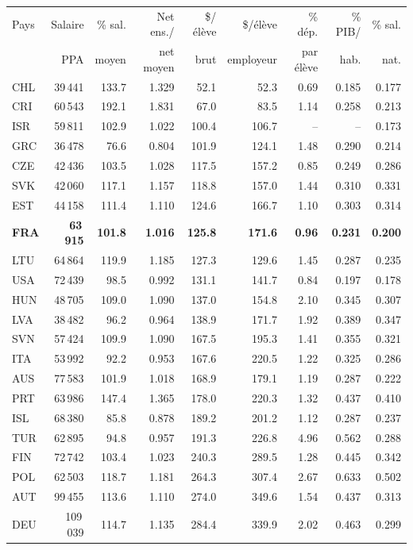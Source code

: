 \begin{tabular}{lrrrrrrrr}
\toprule
Pays & Salaire & \% sal. & Net ens./ & \$/élève & \$/élève & \% dép. & \% PIB/ & \% sal. \\
 & PPA & moyen & net moyen & brut & employeur & par élève & hab. & nat. \\
\midrule
CHL & 39\,441 & 133.7 & 1.329 & 52.1 & 52.3 & 0.69 & 0.185 & 0.177 \\
CRI & 60\,543 & 192.1 & 1.831 & 67.0 & 83.5 & 1.14 & 0.258 & 0.213 \\
ISR & 59\,811 & 102.9 & 1.022 & 100.4 & 106.7 & -- & -- & 0.173 \\
GRC & 36\,478 & 76.6 & 0.804 & 101.9 & 124.1 & 1.48 & 0.290 & 0.214 \\
CZE & 42\,436 & 103.5 & 1.028 & 117.5 & 157.2 & 0.85 & 0.249 & 0.286 \\
SVK & 42\,060 & 117.1 & 1.157 & 118.8 & 157.0 & 1.44 & 0.310 & 0.331 \\
EST & 44\,158 & 111.4 & 1.110 & 124.6 & 166.7 & 1.10 & 0.303 & 0.314 \\
\textbf{FRA} & \textbf{63\,915} & \textbf{101.8} & \textbf{1.016} & \textbf{125.8} & \textbf{171.6} & \textbf{0.96} & \textbf{0.231} & \textbf{0.200} \\
LTU & 64\,864 & 119.9 & 1.185 & 127.3 & 129.6 & 1.45 & 0.287 & 0.235 \\
USA & 72\,439 & 98.5 & 0.992 & 131.1 & 141.7 & 0.84 & 0.197 & 0.178 \\
HUN & 48\,705 & 109.0 & 1.090 & 137.0 & 154.8 & 2.10 & 0.345 & 0.307 \\
LVA & 38\,482 & 96.2 & 0.964 & 138.9 & 171.7 & 1.92 & 0.389 & 0.347 \\
SVN & 57\,424 & 109.9 & 1.090 & 167.5 & 195.3 & 1.41 & 0.355 & 0.321 \\
ITA & 53\,992 & 92.2 & 0.953 & 167.6 & 220.5 & 1.22 & 0.325 & 0.286 \\
AUS & 77\,583 & 101.9 & 1.018 & 168.9 & 179.1 & 1.19 & 0.287 & 0.222 \\
PRT & 63\,986 & 147.4 & 1.365 & 178.0 & 220.3 & 1.32 & 0.437 & 0.410 \\
ISL & 68\,380 & 85.8 & 0.878 & 189.2 & 201.2 & 1.12 & 0.287 & 0.237 \\
TUR & 62\,895 & 94.8 & 0.957 & 191.3 & 226.8 & 4.96 & 0.562 & 0.288 \\
FIN & 72\,742 & 103.4 & 1.023 & 240.3 & 289.5 & 1.28 & 0.445 & 0.342 \\
POL & 62\,503 & 118.7 & 1.181 & 264.3 & 307.4 & 2.67 & 0.633 & 0.502 \\
AUT & 99\,455 & 113.6 & 1.110 & 274.0 & 349.6 & 1.54 & 0.437 & 0.313 \\
DEU & 109\,039 & 114.7 & 1.135 & 284.4 & 339.9 & 2.02 & 0.463 & 0.299 \\
\bottomrule
\end{tabular}
